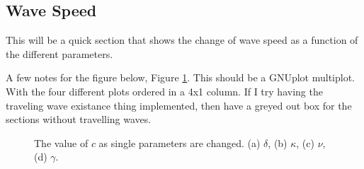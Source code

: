 \subsection{Wave Speed}

This will be a quick section that shows the change of wave speed as a function of the different parameters.

A few notes for the figure below, Figure \ref{fig:paramwavespeed}. This should be a GNUplot multiplot. With the four different plots ordered in a 4x1 column. If I try having the traveling wave existance thing implemented, then have a greyed out box for the sections without travelling waves.

\begin{figure}
  \centering
  \caption{The value of $c$ as single parameters are changed. (a) $\delta$, (b) $\kappa$, (c) $\nu$, (d) $\gamma$. }
  \label{fig:paramwavespeed}
\end{figure}


